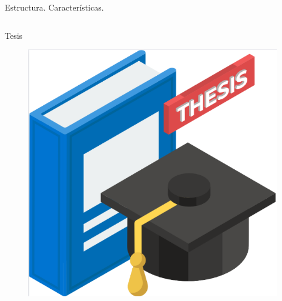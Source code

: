 \documentclass[aspectratio=169, 10pt]{beamer}
\begin{document}
\begin{frame}{Estructura. Características.}
\begin{itemize}
\begin{columns}
    \begin{column}{.16\linewidth}
    \centering
    Tesis
    \begin{figure}
        \centering
        \includegraphics[scale=.1]{tesis.png} 
        \label{fig:enter-label}
    \end{figure}
    \end{column} \pause
    

\end{columns}
\end{itemize}
\end{frame}
\end{document}
